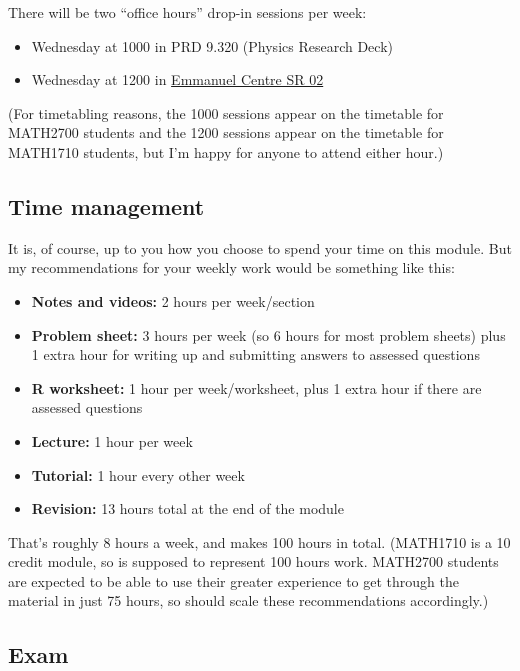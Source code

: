 \documentclass[
  a4paper,
]{book}
\providecommand{\tightlist}{%
  \setlength{\itemsep}{0pt}\setlength{\parskip}{0pt}}
\theoremstyle{definition}
\theoremstyle{definition}
\theoremstyle{definition}
\theoremstyle{definition}
\theoremstyle{remark}
\begin{document}
There will be two ``office hours'' drop-in sessions per week:

\begin{itemize}
\tightlist
\item
  Wednesday at 1000 in PRD 9.320 (Physics Research Deck)
\item
  Wednesday at 1200 in \href{https://students.leeds.ac.uk/rooms?type=room\&id=99930}{Emmanuel Centre SR 02}
\end{itemize}

(For timetabling reasons, the 1000 sessions appear on the timetable for MATH2700 students and the 1200 sessions appear on the timetable for MATH1710 students, but I'm happy for anyone to attend either hour.)

\hypertarget{time}{%
\subsection*{Time management}\label{time}}

It is, of course, up to you how you choose to spend your time on this module. But my recommendations for your weekly work would be something like this:

\begin{itemize}
\tightlist
\item
  \textbf{Notes and videos:} 2 hours per week/section
\item
  \textbf{Problem sheet:} 3 hours per week (so 6 hours for most problem sheets) plus 1 extra hour for writing up and submitting answers to assessed questions
\item
  \textbf{R worksheet:} 1 hour per week/worksheet, plus 1 extra hour if there are assessed questions
\item
  \textbf{Lecture:} 1 hour per week
\item
  \textbf{Tutorial:} 1 hour every other week
\item
  \textbf{Revision:} 13 hours total at the end of the module
\end{itemize}

That's roughly 8 hours a week, and makes 100 hours in total. (MATH1710 is a 10 credit module, so is supposed to represent 100 hours work. MATH2700 students are expected to be able to use their greater experience to get through the material in just 75 hours, so should scale these recommendations accordingly.)

\hypertarget{exam}{%
\subsection*{Exam}\label{exam}}
\end{document}

